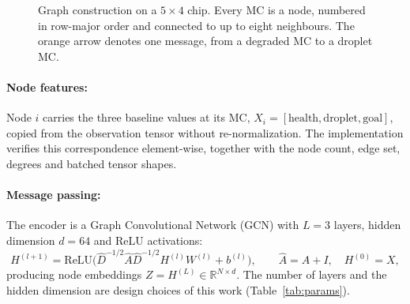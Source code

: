 \documentclass[11pt,a4paper]{article}
\begin{document}
\begin{figure}[H]
\centering
{}
\caption{Graph construction on a $5\times4$ chip. Every MC is a node,
  numbered in row-major order and connected to up to eight neighbours. The
  orange arrow denotes one message, from a degraded MC to a droplet MC.}
\label{fig:graph}
\end{figure}

\paragraph{Node features:}
Node $i$ carries the three baseline values at its MC,
$X_i=[\text{health},\text{droplet},\text{goal}]$, copied from the observation
tensor without re-normalization. The implementation verifies this
correspondence element-wise, together with the node count, edge set, degrees
and batched tensor shapes.

\paragraph{Message passing:}
The encoder is a Graph Convolutional Network (GCN) \cite{kipf2017} with
$L=3$ layers, hidden dimension $d=64$ and ReLU activations:
\begin{equation}
  H^{(l+1)} = \mathrm{ReLU}\!\big(\hat{D}^{-1/2}\hat{A}\hat{D}^{-1/2} H^{(l)} W^{(l)} + b^{(l)}\big),
  \qquad \hat{A}=A+I,\quad H^{(0)}=X,
\end{equation}
producing node embeddings $Z=H^{(L)}\in\mathbb{R}^{N\times d}$. The number of layers and
the hidden dimension are design choices of this work (Table~\ref{tab:params}).
\end{document}
